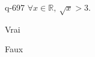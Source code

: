 \begin{truefalse}{q-697}
$\forall x \in \mathbb R,\: \sqrt x > 3$.
\item Vrai
\item* Faux
\end{truefalse}

